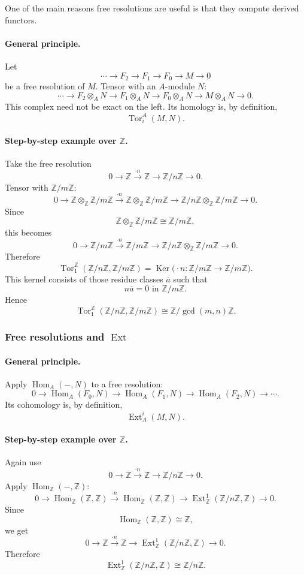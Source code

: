 \documentclass[12pt,a4paper]{article}
\theoremstyle{notespace}
\DeclareMathOperator{\Hom}{Hom}
\DeclareMathOperator{\Tor}{Tor}
\DeclareMathOperator{\Ext}{Ext}
\newcommand{\kerf}{\operatorname{Ker}}
\newcommand{\ZZ}{\mathbb{Z}}
\begin{document}
One of the main reasons free resolutions are useful is that they compute derived functors.

\paragraph{General principle.}

Let
\[
\cdots \to F_2\to F_1\to F_0\to M\to 0
\]
be a free resolution of \(M\). Tensor with an \(A\)-module \(N\):
\[
\cdots \to F_2\otimes_A N \to F_1\otimes_A N \to F_0\otimes_A N \to M\otimes_A N \to 0.
\]
This complex need not be exact on the left. Its homology is, by definition,
\[
\Tor_i^A(M,N).
\]

\paragraph{Step-by-step example over \(\ZZ\).}

Take the free resolution
\[
0\to \ZZ \xrightarrow{\cdot n} \ZZ \to \ZZ/n\ZZ \to 0.
\]
Tensor with \(\ZZ/m\ZZ\):
\[
0\to \ZZ\otimes_\ZZ \ZZ/m\ZZ \xrightarrow{\cdot n}
\ZZ\otimes_\ZZ \ZZ/m\ZZ \to \ZZ/n\ZZ\otimes_\ZZ \ZZ/m\ZZ \to 0.
\]
Since
\[
\ZZ\otimes_\ZZ \ZZ/m\ZZ \cong \ZZ/m\ZZ,
\]
this becomes
\[
0\to \ZZ/m\ZZ \xrightarrow{\cdot n} \ZZ/m\ZZ \to \ZZ/n\ZZ\otimes_\ZZ \ZZ/m\ZZ \to 0.
\]
Therefore
\[
\Tor_1^\ZZ(\ZZ/n\ZZ,\ZZ/m\ZZ)=\kerf\bigl(\cdot n:\ZZ/m\ZZ\to \ZZ/m\ZZ\bigr).
\]
This kernel consists of those residue classes \(\overline a\) such that
\[
n\overline a=0 \text{ in } \ZZ/m\ZZ.
\]
Hence
\[
\Tor_1^\ZZ(\ZZ/n\ZZ,\ZZ/m\ZZ)\cong \ZZ/\gcd(m,n)\ZZ.
\]

\subsubsection{Free resolutions and \(\Ext\)}

\paragraph{General principle.}

Apply \(\Hom_A(-,N)\) to a free resolution:
\[
0\to \Hom_A(F_0,N)\to \Hom_A(F_1,N)\to \Hom_A(F_2,N)\to \cdots.
\]
Its cohomology is, by definition,
\[
\Ext_A^i(M,N).
\]

\paragraph{Step-by-step example over \(\ZZ\).}

Again use
\[
0\to \ZZ \xrightarrow{\cdot n} \ZZ \to \ZZ/n\ZZ \to 0.
\]
Apply \(\Hom_\ZZ(-,\ZZ)\):
\[
0\to \Hom_\ZZ(\ZZ,\ZZ)\xrightarrow{\cdot n}\Hom_\ZZ(\ZZ,\ZZ)\to \Ext_\ZZ^1(\ZZ/n\ZZ,\ZZ)\to 0.
\]
Since
\[
\Hom_\ZZ(\ZZ,\ZZ)\cong \ZZ,
\]
we get
\[
0\to \ZZ \xrightarrow{\cdot n} \ZZ \to \Ext_\ZZ^1(\ZZ/n\ZZ,\ZZ)\to 0.
\]
Therefore
\[
\Ext_\ZZ^1(\ZZ/n\ZZ,\ZZ)\cong \ZZ/n\ZZ.
\]
\end{document}

